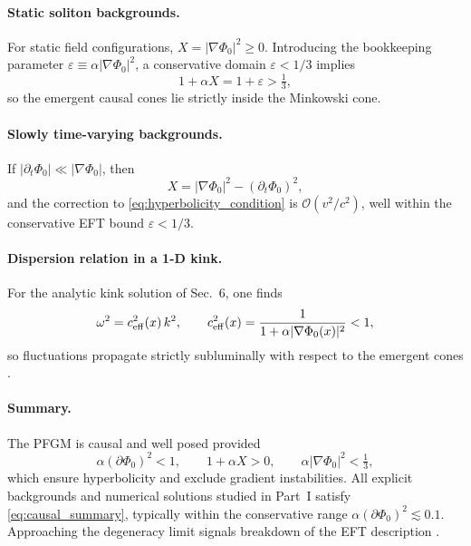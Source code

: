 \documentclass{article}
\begin{document}
\paragraph*{Static soliton backgrounds.}
For static field configurations, $X=|\nabla\Phi_{0}|^{2}\ge 0$. Introducing the bookkeeping parameter $\varepsilon \equiv \alpha |\nabla\Phi_{0}|^{2}$, a conservative domain $\varepsilon<1/3$ implies
\begin{equation}
1+\alpha X = 1+\varepsilon > \tfrac{1}{3},
\label{eq:static_hyperbolicity}
\end{equation}
so the emergent causal cones lie strictly inside the Minkowski cone.

\paragraph*{Slowly time-varying backgrounds.}
If $|\partial_{t}\Phi_{0}| \ll |\nabla\Phi_{0}|$, then
\begin{equation}
X = |\nabla\Phi_{0}|^{2} - (\partial_{t}\Phi_{0})^{2},
\label{eq:X_timevarying}
\end{equation}
and the correction to \eqref{eq:hyperbolicity_condition} is $\mathcal{O}(v^{2}/c^{2})$, well within the conservative EFT bound $\varepsilon<1/3$.

\paragraph*{Dispersion relation in a 1-D kink.}
For the analytic kink solution of Sec.~6, one finds
\begin{equation}
\omega^{2} = c_{\rm eff}^{2}(x)\,k^{2}, 
\qquad
c_{\rm eff}^{2}(x) = \frac{1}{1+\alpha |\nabla\Phi_{0}(x)|^{2}} < 1 ,
\label{eq:dispersion_local}
\end{equation}
so fluctuations propagate strictly subluminally with respect to the emergent cones \cite{Babichev2008}.

\paragraph*{Summary.}
The PFGM is causal and well posed provided
\begin{equation}
\alpha(\partial\Phi_{0})^{2} < 1,
\qquad
1+\alpha X > 0,
\qquad
\alpha |\nabla\Phi_{0}|^{2} < \tfrac{1}{3},
\label{eq:causal_summary}
\end{equation}
which ensure hyperbolicity and exclude gradient instabilities.  
All explicit backgrounds and numerical solutions studied in Part~I satisfy \eqref{eq:causal_summary}, typically within the conservative range $\alpha(\partial\Phi_{0})^{2}\lesssim 0.1$. Approaching the degeneracy limit signals breakdown of the EFT description \cite{PapalloReall2017}.
\end{document}
